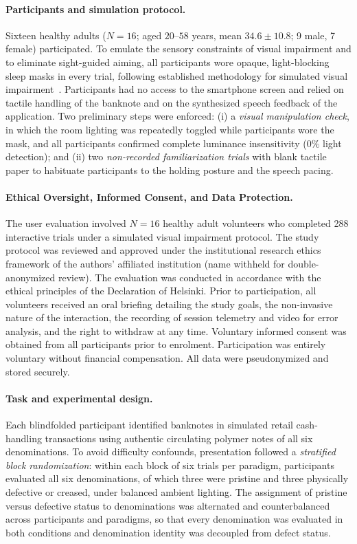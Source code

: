 \documentclass[final,5p,times,twocolumn,authoryear]{elsarticle}
\begin{document}
\paragraph{Participants and simulation protocol.}
Sixteen healthy adults ($N=16$; aged $20$--$58$ years, mean $34.6 \pm 10.8$; 9 male, 7 female) participated. To emulate the sensory constraints of visual impairment and to eliminate sight-guided aiming, all participants wore opaque, light-blocking sleep masks in every trial, following established methodology for simulated visual impairment~\cite{Sato2019,Guerreiro2019}. Participants had no access to the smartphone screen and relied on tactile handling of the banknote and on the synthesized speech feedback of the application. Two preliminary steps were enforced: (i) a \textit{visual manipulation check}, in which the room lighting was repeatedly toggled while participants wore the mask, and all participants confirmed complete luminance insensitivity ($0\%$ light detection); and (ii) two \textit{non-recorded familiarization trials} with blank tactile paper to habituate participants to the holding posture and the speech pacing.

\paragraph{Ethical Oversight, Informed Consent, and Data Protection.}
The user evaluation involved $N=16$ healthy adult volunteers who completed 288 interactive trials under a simulated visual impairment protocol. The study protocol was reviewed and approved under the institutional research ethics framework of the authors' affiliated institution (name withheld for double-anonymized review). The evaluation was conducted in accordance with the ethical principles of the Declaration of Helsinki. Prior to participation, all volunteers received an oral briefing detailing the study goals, the non-invasive nature of the interaction, the recording of session telemetry and video for error analysis, and the right to withdraw at any time. Voluntary informed consent was obtained from all participants prior to enrolment. Participation was entirely voluntary without financial compensation. All data were pseudonymized and stored securely.


\paragraph{Task and experimental design.}
Each blindfolded participant identified banknotes in simulated retail cash-handling transactions using authentic circulating polymer notes of all six denominations. To avoid difficulty confounds, presentation followed a \textit{stratified block randomization}: within each block of six trials per paradigm, participants evaluated all six denominations, of which three were pristine and three physically defective or creased, under balanced ambient lighting. The assignment of pristine versus defective status to denominations was alternated and counterbalanced across participants and paradigms, so that every denomination was evaluated in both conditions and denomination identity was decoupled from defect status.
\end{document}
